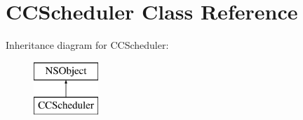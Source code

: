 \hypertarget{class_c_c_scheduler}{\section{C\-C\-Scheduler Class Reference}
\label{class_c_c_scheduler}
}
Inheritance diagram for C\-C\-Scheduler\-:\begin{figure}[H]
\begin{center}
\leavevmode
\includegraphics[height=2.000000cm]{class_c_c_scheduler}
\end{center}
\end{figure}
